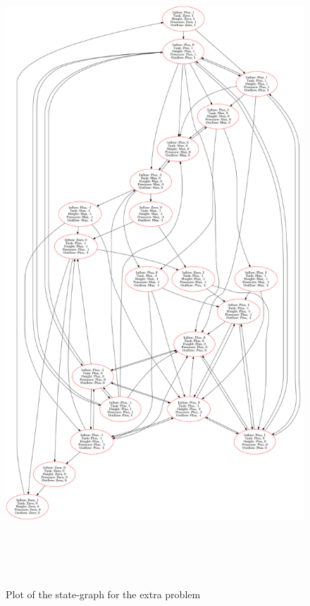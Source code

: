 \documentclass[a4paper]{article}
\begin{document}
\begin{figure}[H]
	\centering
	\includegraphics[width=\textwidth,height=9.5in,keepaspectratio]{result_extra_problem.png}
	\caption{Plot of the state-graph for the extra problem}
	\label{fig:state_graph_extra}
\end{figure}
\end{document}
